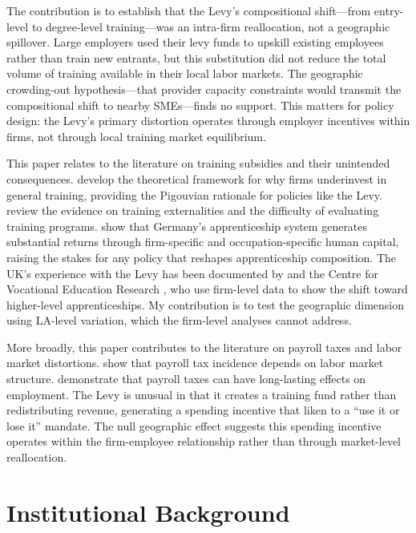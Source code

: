 \documentclass[12pt]{article}
\begin{document}
The contribution is to establish that the Levy's compositional shift---from entry-level to degree-level training---was an intra-firm reallocation, not a geographic spillover. Large employers used their levy funds to upskill existing employees rather than train new entrants, but this substitution did not reduce the total volume of training available in their local labor markets. The geographic crowding-out hypothesis---that provider capacity constraints would transmit the compositional shift to nearby SMEs---finds no support. This matters for policy design: the Levy's primary distortion operates through employer incentives within firms, not through local training market equilibrium.

This paper relates to the literature on training subsidies and their unintended consequences. \citet{acemoglu1999} develop the theoretical framework for why firms underinvest in general training, providing the Pigouvian rationale for policies like the Levy. \citet{leuven2005} review the evidence on training externalities and the difficulty of evaluating training programs. \citet{dustmann2012} show that Germany's apprenticeship system generates substantial returns through firm-specific and occupation-specific human capital, raising the stakes for any policy that reshapes apprenticeship composition. The UK's experience with the Levy has been documented by \citet{fuller2019} and the Centre for Vocational Education Research \citep{patrignani2021}, who use firm-level data to show the shift toward higher-level apprenticeships. My contribution is to test the geographic dimension using LA-level variation, which the firm-level analyses cannot address.

More broadly, this paper contributes to the literature on payroll taxes and labor market distortions. \citet{saez2019} show that payroll tax incidence depends on labor market structure. \citet{benzarti2019} demonstrate that payroll taxes can have long-lasting effects on employment. The Levy is unusual in that it creates a training fund rather than redistributing revenue, generating a spending incentive that \citet{dougherty2020} liken to a ``use it or lose it'' mandate. The null geographic effect suggests this spending incentive operates within the firm-employee relationship rather than through market-level reallocation.

\section{Institutional Background}
\end{document}
